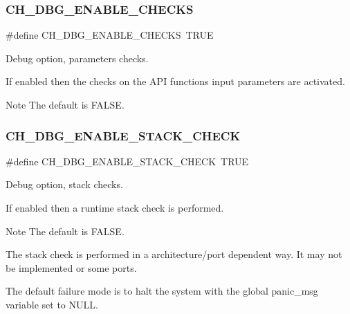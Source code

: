 \subsubsection{\texorpdfstring{C\+H\+\_\+\+D\+B\+G\+\_\+\+E\+N\+A\+B\+L\+E\+\_\+\+C\+H\+E\+C\+KS}{CH\_DBG\_ENABLE\_CHECKS}}
{\footnotesize\ttfamily \#define C\+H\+\_\+\+D\+B\+G\+\_\+\+E\+N\+A\+B\+L\+E\+\_\+\+C\+H\+E\+C\+KS~T\+R\+UE}



Debug option, parameters checks. 

If enabled then the checks on the A\+PI functions input parameters are activated.

\begin{DoxyNote}{Note}
The default is {\ttfamily F\+A\+L\+SE}. 
\end{DoxyNote}
\hypertarget{group__config_gab93d9ee904f15d4f2c26ef2a1394a1d7}{}\label{group__config_gab93d9ee904f15d4f2c26ef2a1394a1d7} 
\subsubsection{\texorpdfstring{C\+H\+\_\+\+D\+B\+G\+\_\+\+E\+N\+A\+B\+L\+E\+\_\+\+S\+T\+A\+C\+K\+\_\+\+C\+H\+E\+CK}{CH\_DBG\_ENABLE\_STACK\_CHECK}}
{\footnotesize\ttfamily \#define C\+H\+\_\+\+D\+B\+G\+\_\+\+E\+N\+A\+B\+L\+E\+\_\+\+S\+T\+A\+C\+K\+\_\+\+C\+H\+E\+CK~T\+R\+UE}



Debug option, stack checks. 

If enabled then a runtime stack check is performed.

\begin{DoxyNote}{Note}
The default is {\ttfamily F\+A\+L\+SE}. 

The stack check is performed in a architecture/port dependent way. It may not be implemented or some ports. 

The default failure mode is to halt the system with the global {\ttfamily panic\+\_\+msg} variable set to {\ttfamily N\+U\+LL}. 
\end{DoxyNote}
\hypertarget{group__config_ga8bc4cfd861131aeb3c880347d0068229}{}\label{group__config_ga8bc4cfd861131aeb3c880347d0068229} 
